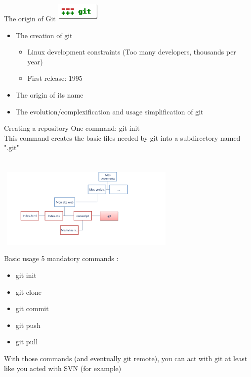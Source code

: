 \documentclass{beamer}
\begin{document}
\begin{frame}{The origin of Git}
    \includegraphics[width=60pt,height=30pt]{git-scm-logo.png}
    \begin{itemize}
        \item The creation of git
        \begin{itemize}
            \item Linux development constraints (Too many developers, thousands per year)
            \item First release: 1995
        \end{itemize}
        \pause
        \item The origin of its name
        \pause
        \item The evolution/complexification and usage simplification of git
    \end{itemize}
\end{frame}

\begin{frame}{Creating a repository}
    One command: git init\\
    This command creates the basic files needed by git into a subdirectory named ".git" \\
    \ \\
    \ \\
    \includegraphics[width=250pt,height=110pt]{fileinit.png}
\end{frame}

\begin{frame}{Basic usage}
    5 mandatory commands : \\
    \begin{itemize}
        \item git init
        \item git clone
        \item git commit
        \item git push
        \item git pull
    \end{itemize}
    With those commands (and eventually git remote), you can act with git at least like you acted with SVN (for example)
\end{frame}
\end{document}
